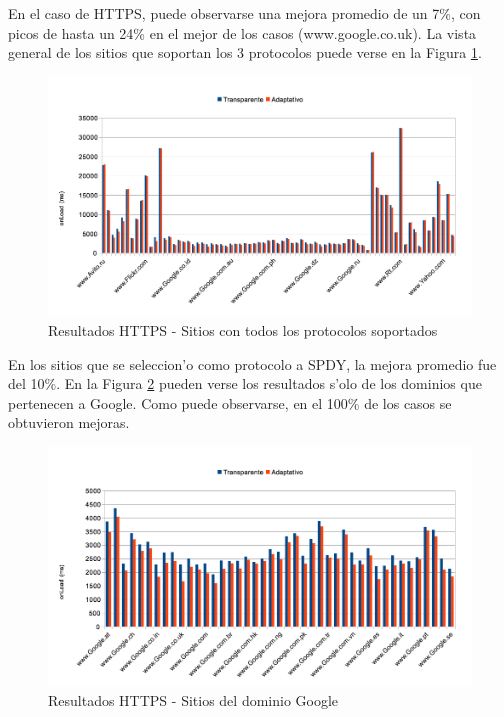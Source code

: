 En el caso de HTTPS, puede observarse una mejora promedio de un 7\%, con picos de hasta un 24\% en el mejor de los casos (www.google.co.uk). La vista general de los sitios que soportan los 3 protocolos puede verse en la Figura \ref{resGralHTTPS}.

\begin{figure}[ht!]
  	\centering
	\includegraphics[width=\textwidth]{img/resGralHTTPS}
	\caption{\small Resultados HTTPS - Sitios con todos los protocolos soportados}
	\label{resGralHTTPS}
\end{figure}

En los sitios que se seleccion'o como protocolo a SPDY, la mejora promedio fue del 10\%. En la Figura \ref{resGoogleHTTPS} pueden verse los resultados s'olo de los dominios que pertenecen a Google. Como puede observarse, en el 100\% de los casos se obtuvieron mejoras.

\begin{figure}[h!]
  	\centering
	\includegraphics[width=\textwidth]{img/resGoogleHTTPS}
	\caption{\small Resultados HTTPS - Sitios del dominio Google}
	\label{resGoogleHTTPS}
\end{figure}

